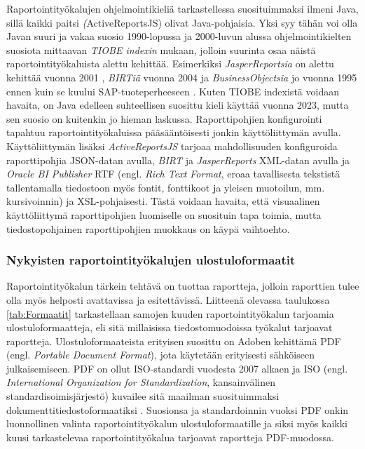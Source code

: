 Raportointityökalujen ohjelmointikieliä tarkastellessa suosituimmaksi ilmeni Java, sillä kaikki paitsi \textit(ActiveReportsJS) olivat Java-pohjaisia. Yksi syy tähän voi olla Javan suuri ja vakaa suosio 1990-lopussa ja 2000-luvun alussa ohjelmointikielten suosiota mittaavan \textit{TIOBE indexin} mukaan\cite{noauthor_tiobe_nodate}, jolloin suurinta osaa näistä raportointityökaluista alettu kehittää. Esimerkiksi \textit{JasperReportsia} on alettu kehittää vuonna 2001 \cite{noauthor_origin_2006}, \textit{BIRTiä} vuonna 2004 \cite{noauthor_eclipse_2004} ja \textit{BusinessObjectsia} jo vuonna 1995 ennen kuin se kuului SAP-tuoteperheeseen \cite{alma9922048891805971}. Kuten {TIOBE indexistä} voidaan havaita, on Java edelleen suhteellisen suosittu kieli käyttää vuonna 2023, mutta sen suosio on kuitenkin jo hieman laskussa. Raporttipohjien konfigurointi tapahtuu raportointityökaluissa pääsääntöisesti jonkin käyttöliittymän avulla. Käyttöliittymän lisäksi \textit{ActiveReportsJS} tarjoaa mahdollisuuden konfiguroida raporttipohjia JSON-datan avulla, \textit{BIRT} ja  \textit{JasperReports} XML-datan avulla ja \textit{Oracle BI Publisher} RTF (engl. \textit{Rich Text Format}, eroaa tavallisesta tekstistä tallentamalla tiedostoon myös fontit, fonttikoot ja yleisen muotoilun, mm. kursivoinnin) ja XSL-pohjaisesti. Tästä voidaan havaita, että visuaalinen käyttöliittymä raporttipohjien luomiselle on suosituin tapa toimia, mutta tiedostopohjainen raporttipohjien muokkaus on käypä vaihtoehto.

\subsubsection{Nykyisten raportointityökalujen ulostuloformaatit}

Raportointityökalun tärkein tehtävä on tuottaa raportteja, jolloin raporttien tulee olla myös helposti avattavissa ja esitettävissä. Liitteenä olevassa taulukossa \ref{tab:Formaatit} tarkastellaan samojen kuuden raportointityökalun tarjoamia ulostuloformaatteja, eli sitä millaisissa tiedostomuodoissa työkalut tarjoavat raportteja. Ulostuloformaateista erityisen suosittu on Adoben kehittämä PDF (engl. \textit{Portable Document Format}), jota käytetään erityisesti sähköiseen julkaisemiseen. PDF on ollut ISO-standardi vuodesta 2007 alkaen ja ISO (engl. \textit{International Organization for Standardization}, kansainvälinen standardisoimisjärjestö) kuvailee sitä maailman suosituimmaksi dokumenttitiedostoformaatiksi \cite{naden_standard_2021}. Suosionsa ja standardoinnin vuoksi PDF onkin luonnollinen valinta raportointityökalun ulostuloformaatille ja siksi myös kaikki kuusi tarkastelevaa raportointityökalua tarjoavat raportteja PDF-muodossa.

